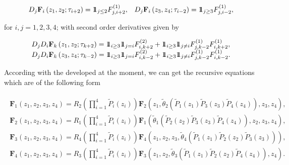 \documentclass{article}
\newcommand{\indora}{\mbox{$1$\hspace{-0.8ex}$1$}}
\begin{document}
\begin{eqnarray}\label{Ec.Gral.Primer.Momento.Ind.Exh}
\begin{array}{ll}
D_{j}\mathbf{F}_{i}\left(z_{1},z_{2};\tau_{i+2}\right)=\indora_{j\leq2}F_{j,i+2}^{(1)},&
D_{j}\mathbf{F}_{i}\left(z_{3},z_{4};\tau_{i-2}\right)=\indora_{j\geq3}F_{j,i-2}^{(1)},
\end{array}
\end{eqnarray}

for $i,j=1,2,3,4$; with second order derivatives given by

\begin{eqnarray}\label{Ec.Gral.Segundo.Momento.Ind.Exh}
\begin{array}{l}
D_{j}D_{i}\mathbf{F}_{k}\left(z_{1},z_{2};\tau_{k+2}\right)=\indora_{i\geq3}\indora_{j=i}F_{i,k+2}^{(2)}+\indora_{i\geq 3}\indora_{j\neq i}F_{j,k-2}^{(1)}F_{i,k+2}^{(1)},\\
D_{j}D_{i}\mathbf{F}_{k}\left(z_{3},z_{4};\tau_{k-2}\right)=\indora_{i\geq3}\indora_{j=i}F_{i,k-2}^{(2)}+\indora_{i\geq 3}\indora_{j\neq i}F_{j,k-2}^{(1)}F_{i,k-2}^{(1)}.
\end{array}
\end{eqnarray}


 According with the developed at the moment, we can get the recursive equations which are of the following form

\begin{eqnarray}\label{General.System.Double.Transfer}
\begin{array}{l}
\mathbf{F}_{1}\left(z_{1},z_{2},z_{3},z_{4}\right)=R_{2}\left(\prod_{i=1}^{4}\tilde{P}_{i}\left(z_{i}
\right)\right)\mathbf{F}_{2}\left(z_{1},\tilde{\theta}_{2}\left(\tilde{P}_{1}\left(z_{1}\right)\tilde{P}_{3}\left(z_{3}\right)\tilde{P}_{4}
\left(z_{4}\right)\right),z_{3},z_{4}\right),\\
\mathbf{F}_{2}\left(z_{1},z_{2},z_{3},z_{4}\right)=R_{1}\left(\prod_{i=1}^{4}\tilde{P}_{i}\left(z_{i}
\right)\right)
\mathbf{F}_{1}\left(\tilde{\theta}_{1}\left(\tilde{P}_{2}\left(z_{2}\right)\tilde{P}_{3}\left(z_{3}
\right)\tilde{P}_{4}\left(z_{4}\right)\right),z_{2},z_{3},z_{4}\right),\\
\mathbf{F}_{3}\left(z_{1},z_{2},z_{3},z_{4}\right)=R_{4}\left(\prod_{i=1}^{4}\tilde{P}_{i}\left(z_{i}
\right)\right)\mathbf{F}_{4}\left(z_{1},z_{2},z_{3},\tilde{\theta}_{4}\left(\tilde{P}_{1}\left(z_{1}\right)\tilde{P}_{2}\left(z_{2}\right)\tilde{P}_{3}\left(z_{3}\right)
\right)\right),\\
\mathbf{F}_{4}\left(z_{1},z_{2},z_{3},z_{4}\right)=R_{3}\left(\prod_{i=1}^{4}\tilde{P}_{i}\left(z_{i}
\right)\right)
\mathbf{F}_{3}\left(z_{1},z_{2},\tilde{\theta}_{3}\left(\tilde{P}_{1}\left(z_{1}\right)\tilde{P}_{2}\left(z_{2}\right)\tilde{P}_{4}
\left(z_{4}\right)\right),z_{4}\right).
\end{array}
\end{eqnarray}
%
%
\end{document}
